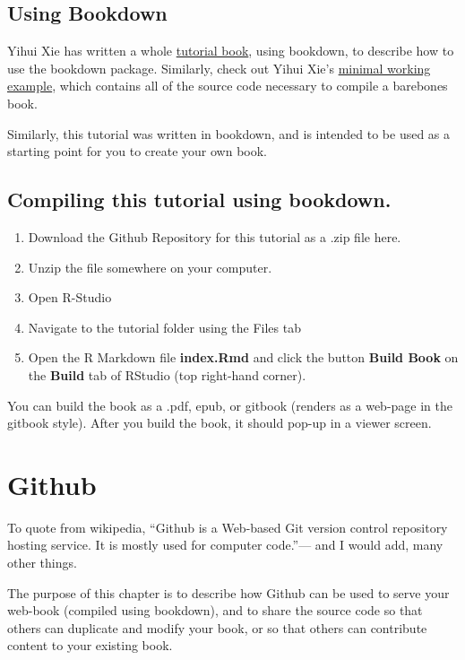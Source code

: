 \documentclass[]{book}
\providecommand{\tightlist}{%
  \setlength{\itemsep}{0pt}\setlength{\parskip}{0pt}}
\theoremstyle{definition}
\theoremstyle{definition}
\theoremstyle{definition}
\theoremstyle{remark}
\begin{document}
\section{Using Bookdown}\label{using-bookdown}

Yihui Xie has written a whole
\href{https://bookdown.org/yihui/bookdown/}{tutorial book}, using
bookdown, to describe how to use the bookdown package. Similarly, check
out Yihui Xie's
\href{https://bookdown.org/yihui/bookdown/get-started.html}{minimal
working example}, which contains all of the source code necessary to
compile a barebones book.

Similarly, this tutorial was written in bookdown, and is intended to be
used as a starting point for you to create your own book.

\section{Compiling this tutorial using
bookdown.}\label{compiling-this-tutorial-using-bookdown.}

\begin{enumerate}
\def\labelenumi{\arabic{enumi}.}
\tightlist
\item
  Download the Github Repository for this tutorial as a .zip file here.
\item
  Unzip the file somewhere on your computer.
\item
  Open R-Studio
\item
  Navigate to the tutorial folder using the Files tab
\item
  Open the R Markdown file \textbf{index.Rmd} and click the button
  \textbf{Build Book} on the \textbf{Build} tab of RStudio (top
  right-hand corner).
\end{enumerate}

You can build the book as a .pdf, epub, or gitbook (renders as a
web-page in the gitbook style). After you build the book, it should
pop-up in a viewer screen.

\chapter{Github}\label{github-1}

To quote from wikipedia, ``Github is a Web-based Git version control
repository hosting service. It is mostly used for computer code.''---
and I would add, many other things.

The purpose of this chapter is to describe how Github can be used to
serve your web-book (compiled using bookdown), and to share the source
code so that others can duplicate and modify your book, or so that
others can contribute content to your existing book.
\end{document}
